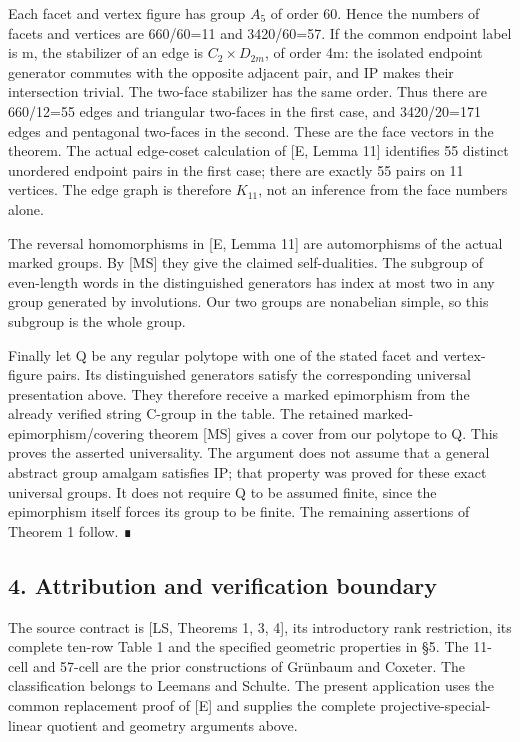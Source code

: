 \documentclass[
  11pt,
  a4paper,
]{article}
\begin{document}
Each facet and vertex figure has group \(A_5\) of order 60. Hence the
numbers of facets and vertices are 660/60=11 and 3420/60=57. If the
common endpoint label is m, the stabilizer of an edge is
\(C_2\times D_{2m}\), of order 4m: the isolated endpoint generator
commutes with the opposite adjacent pair, and IP makes their
intersection trivial. The two-face stabilizer has the same order. Thus
there are 660/12=55 edges and triangular two-faces in the first case,
and 3420/20=171 edges and pentagonal two-faces in the second. These are
the face vectors in the theorem. The actual edge-coset calculation of
{[}E, Lemma 11{]} identifies 55 distinct unordered endpoint pairs in the
first case; there are exactly 55 pairs on 11 vertices. The edge graph is
therefore \(K_{11}\), not an inference from the face numbers alone.

The reversal homomorphisms in {[}E, Lemma 11{]} are automorphisms of the
actual marked groups. By {[}MS{]} they give the claimed self-dualities.
The subgroup of even-length words in the distinguished generators has
index at most two in any group generated by involutions. Our two groups
are nonabelian simple, so this subgroup is the whole group.

Finally let Q be any regular polytope with one of the stated facet and
vertex-figure pairs. Its distinguished generators satisfy the
corresponding universal presentation above. They therefore receive a
marked epimorphism from the already verified string C-group in the
table. The retained marked-epimorphism/covering theorem {[}MS{]} gives a
cover from our polytope to Q. This proves the asserted universality. The
argument does not assume that a general abstract group amalgam satisfies
IP; that property was proved for these exact universal groups. It does
not require Q to be assumed finite, since the epimorphism itself forces
its group to be finite. The remaining assertions of Theorem 1 follow. ∎

\subsection{4. Attribution and verification
boundary}\label{attribution-and-verification-boundary}

The source contract is {[}LS, Theorems 1, 3, 4{]}, its introductory rank
restriction, its complete ten-row Table 1 and the specified geometric
properties in §5. The 11-cell and 57-cell are the prior constructions of
Grünbaum and Coxeter. The classification belongs to Leemans and Schulte.
The present application uses the common replacement proof of {[}E{]} and
supplies the complete projective-special-linear quotient and geometry
arguments above.
\end{document}

